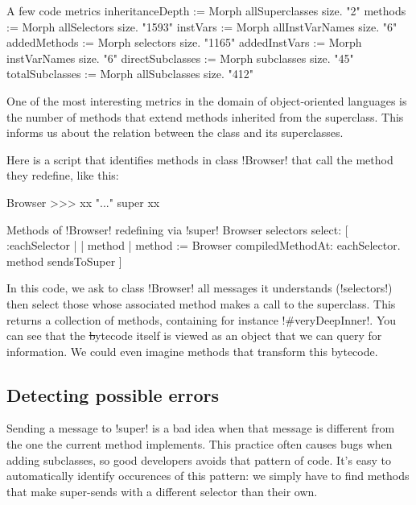 \documentclass[a4paper,10pt,twoside]{book}
\begin{document}
\begin{script}[metrics]{A few code metrics}
	inheritanceDepth := Morph allSuperclasses size. "2"
	methods := Morph allSelectors size. "1593"
	instVars := Morph allInstVarNames size. "6"
	addedMethods := Morph selectors size. "1165"
	addedInstVars := Morph instVarNames size. "6"
	directSubclasses := Morph subclasses size. "45"
	totalSubclasses := Morph allSubclasses size. "412"
\end{script}

One of the most interesting metrics in the domain of object-oriented languages is the number of methods that extend methods inherited from the superclass.
This informs us about the relation between the class and its superclasses.

Here is a script that identifies methods in class \ct!Browser! that call the method they redefine, like this:
\begin{code}{}
Browser >>> xx
	"..."
	super xx
\end{code}

\begin{script}[browsersendstosuper]{Methods of \ct!Browser! redefining via \ct!super!}
Browser selectors select: [ :eachSelector |
	| method |
	method := Browser compiledMethodAt: eachSelector.
	method sendsToSuper ]
\end{script}

In this code, we ask to class \ct!Browser! all messages it understands (\ct!selectors!) then select those whose associated method makes a call to the superclass.
This returns a collection of methods, containing for instance \ct!#veryDeepInner!.
You can see that the \st bytecode itself is viewed as an object that we can query for information.
We could even imagine methods that transform this bytecode.

\subsection{Detecting possible errors}

Sending a message to \ct!super! is a bad idea when that message is different from the one the current method implements.
This practice often causes bugs when adding subclasses, so good developers avoids that pattern of code.
It's easy to automatically identify occurences of this pattern: we simply have to find methods that make super-sends with a different selector than their own.
\end{document}
